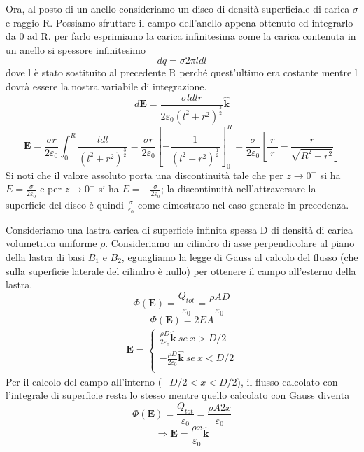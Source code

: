 \documentclass[
10pt, %
a4paper, %
oneside, %
headinclude,footinclude, %
BCOR5mm, %
]{scrartcl}
\begin{document}
\begin{esercizio}
Ora, al posto di un anello consideriamo un disco di densità superficiale di carica $\sigma$ e raggio R. Possiamo sfruttare il campo dell'anello appena ottenuto ed integrarlo da 0 ad R. per farlo esprimiamo la carica infinitesima come la carica contenuta in un anello si spessore infinitesimo
\[dq = \sigma 2\pi l dl\]
dove l è stato sostituito al precedente R perché quest'ultimo era costante mentre l dovrà essere la nostra variabile di integrazione. 
\[d\mathbf{E} = \frac{  \sigma l dl r }{2\varepsilon_0 (l^2+r^2)^{\frac{3}{2}}}\hat{\mathbf{k}}\]
\[\mathbf{E} = \frac{\sigma r}{2\varepsilon_0}\int_{0}^{R}\frac{ldl}{(l^2+r^2)^{\frac{3}{2}}} = \frac{\sigma r}{2\varepsilon_0}\left[-\frac{1}{(l^2+r^2)^{\frac{1}{2}}}\right]^R_0 = \frac{\sigma }{2\varepsilon_0}\left[\frac{r}{|r|}-\frac{r}{\sqrt{R^2+r^2}}\right]\]
Si noti che il valore assoluto porta una discontinuità tale che per \(z\to0^+\) si ha \(E = \frac{\sigma}{2\varepsilon_0}\) e per \(z\to0^-\) si ha \(E = -\frac{\sigma}{2\varepsilon_0}\); la discontinuità nell'attraversare la superficie del disco è quindi \(\frac{\sigma}{\varepsilon_0}\) come dimostrato nel caso generale in precedenza.
\end{esercizio}
\begin{esercizio}
Consideriamo una lastra carica di superficie infinita spessa D di densità di carica volumetrica uniforme $\rho$. Consideriamo un cilindro di asse perpendicolare al piano della lastra di basi \(B_1\) e \(B_2\), eguagliamo la legge di Gauss al calcolo del flusso (che sulla superficie laterale del cilindro è nullo) per ottenere il campo all'esterno della lastra. 
\[\Phi(\mathbf{E}) = \frac{Q_{tot}}{\varepsilon_0} = \frac{\rho A D}{\varepsilon_0}\]
\[\Phi(\mathbf{E}) = 2EA\]
\begin{align*}
	\mathbf{E} =
	\begin{cases}
	\frac{\rho D}{2\varepsilon_0}\hat{\mathbf{k}}\ se\ x>D/2\\
	-\frac{\rho D}{2\varepsilon_0}\hat{\mathbf{k}}\ se\ x<D/2\\
	\end{cases}
\end{align*}
 Per il calcolo del campo all'interno (\(-D/2<x<D/2\)), il flusso calcolato con l'integrale di superficie resta lo stesso mentre quello calcolato con Gauss diventa
  \[\Phi(\mathbf{E}) = \frac{Q_{tot}}{\varepsilon_0} = \frac{\rho A 2x}{\varepsilon_0} \]
  \[\Rightarrow \mathbf{E} = \frac{\rho x}{\varepsilon_0}\hat{\mathbf{k}}\]
\end{esercizio}
\end{document}
